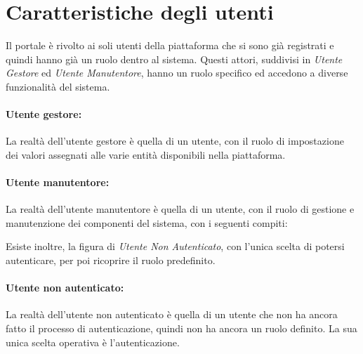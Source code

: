 \section{Caratteristiche degli utenti}

Il portale è rivolto ai soli utenti della piattaforma che si sono già registrati e quindi hanno già un ruolo dentro al sistema.
Questi attori, suddivisi in \textit{Utente Gestore} ed \textit{Utente Manutentore}, hanno un ruolo specifico ed accedono a diverse funzionalità del sistema.

\paragraph{Utente gestore:} La realtà dell'utente gestore è quella di un utente, con il ruolo di impostazione dei valori assegnati alle varie entità disponibili nella piattaforma.

\paragraph{Utente manutentore:} La realtà dell'utente manutentore è quella di un utente, con il ruolo di gestione e manutenzione dei componenti del sistema, con i seguenti compiti:

Esiste inoltre, la figura di \textit{Utente Non Autenticato}, con l'unica scelta di potersi autenticare, per poi ricoprire il ruolo predefinito.

\paragraph{Utente non autenticato:} La realtà dell'utente non autenticato è quella di un utente che non ha ancora fatto il processo di autenticazione, quindi non ha ancora un ruolo definito. La sua unica scelta operativa è l'autenticazione.
